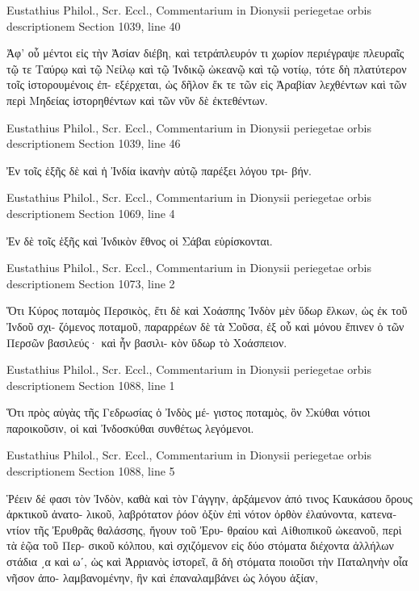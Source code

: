 \documentclass[12pt,letterpaper,twoside,final]{memoir}
\begin{document}
\begin{greek}
Eustathius Philol., Scr. Eccl., Commentarium in Dionysii periegetae orbis descriptionem 
Section 1039, line 40

              Ἀφ' οὗ μέντοι εἰς τὴν Ἀσίαν διέβη, 
καὶ τετράπλευρόν τι χωρίον περιέγραψε πλευραῖς τῷ 
τε Ταύρῳ καὶ τῷ Νείλῳ καὶ τῷ Ἰνδικῷ ὠκεανῷ καὶ 
τῷ νοτίῳ, τότε δὴ πλατύτερον τοῖς ἱστορουμένοις ἐπ-
εξέρχεται, ὡς δῆλον ἔκ τε τῶν εἰς Ἀραβίαν λεχθέντων 
καὶ τῶν περὶ Μηδείας ἱστορηθέντων καὶ τῶν νῦν δὲ 
ἐκτεθέντων. 



Eustathius Philol., Scr. Eccl., Commentarium in Dionysii periegetae orbis descriptionem 
Section 1039, line 46

                                                Ἐν τοῖς 
ἑξῆς δὲ καὶ ἡ Ἰνδία ἱκανὴν αὐτῷ παρέξει λόγου τρι-
βήν. 



Eustathius Philol., Scr. Eccl., Commentarium in Dionysii periegetae orbis descriptionem 
Section 1069, line 4

                                             Ἐν δὲ τοῖς 
ἑξῆς καὶ Ἰνδικὸν ἔθνος οἱ Σάβαι εὑρίσκονται. 



Eustathius Philol., Scr. Eccl., Commentarium in Dionysii periegetae orbis descriptionem 
Section 1073, line 2

Ὅτι Κύρος ποταμὸς Περσικὸς, ἔτι δὲ καὶ 
Χοάσπης Ἰνδὸν μὲν ὕδωρ ἕλκων, ὡς ἐκ τοῦ Ἰνδοῦ σχι-
ζόμενος ποταμοῦ, παραρρέων δὲ τὰ Σοῦσα, ἐξ οὗ καὶ 
μόνου ἔπινεν ὁ τῶν Περσῶν βασιλεύς· καὶ ἦν βασιλι-
κὸν ὕδωρ τὸ Χοάσπειον. 



Eustathius Philol., Scr. Eccl., Commentarium in Dionysii periegetae orbis descriptionem 
Section 1088, line 1

Ὅτι πρὸς αὐγὰς τῆς Γεδρωσίας ὁ Ἰνδὸς μέ-
γιστος ποταμὸς, ὃν Σκύθαι νότιοι παροικοῦσιν, οἱ καὶ 
Ἰνδοσκύθαι συνθέτως λεγόμενοι. 



Eustathius Philol., Scr. Eccl., Commentarium in Dionysii periegetae orbis descriptionem 
Section 1088, line 5

         Ῥέειν δέ φασι τὸν Ἰνδὸν, καθὰ καὶ τὸν Γάγγην, 
ἀρξάμενον ἀπό τινος Καυκάσου ὄρους ἀρκτικοῦ ἀνατο-  
λικοῦ, λαβρότατον ῥόον ὀξὺν ἐπὶ νότον ὀρθὸν ἐλαύνοντα, 
κατεναντίον τῆς Ἐρυθρᾶς θαλάσσης, ἤγουν τοῦ Ἐρυ-
θραίου καὶ Αἰθιοπικοῦ ὠκεανοῦ, περὶ τὰ ἑῷα τοῦ Περ-
σικοῦ κόλπου, καὶ σχιζόμενον εἰς δύο στόματα διέχοντα 
ἀλλήλων στάδια ͵α καὶ ωʹ, ὡς καὶ Ἀρριανὸς ἱστορεῖ, ἃ 
δὴ στόματα ποιοῦσι τὴν Παταληνὴν οἷα νῆσον ἀπο-
λαμβανομένην, ἣν καὶ ἐπαναλαμβάνει ὡς λόγου ἀξίαν, 





\end{greek}
\end{document}
